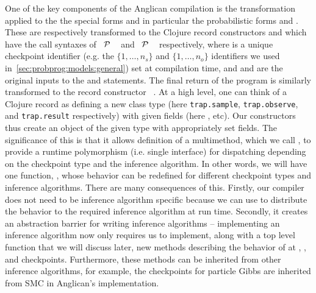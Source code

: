One of the key components of the Anglican compilation is the transformation applied to the
the special forms and in particular the probabilistic forms \sample and \observe.  These
are respectively transformed to the Clojure record constructors \samplecps and \observecps 
which have the call syntaxes of
 ~$\mathcal{P}$ ~\angstate\clj{)} and  ~$\mathcal{P}$ ~\angstate\clj{)}
respectively,
where  is a unique checkpoint identifier (e.g. the $\{1,\dots,n_s\}$ and $\{1,\dots,n_o\}$ identifiers
we used in~\ref{sec:probprog:models:general}) set at compilation time, and   and 
are the original inputs to the \sample and \observe statements.  
The final return of the program is similarly transformed to the record constructor
~\angstate\clj{)}.
At a high level, one can
think of a Clojure record as defining a new class type (here {\small \texttt{trap.sample}}, {\small \texttt{trap.observe}},
and {\small \texttt{trap.result}} respectively) with given fields (here ,  etc).  Our constructors thus create
an object of the given type with appropriately set fields.  The significance of this is that
it allows definition of a multimethod, which we call \checkpoint, to provide a runtime polymorphism
(i.e. single interface) for dispatching depending on the checkpoint
type and the inference algorithm.  In other words, we will have one function, \checkpoint, whose
behavior can be redefined for different checkpoint types and inference algorithms.  There are many
consequences of this.  Firstly, our compiler does not need to be inference algorithm specific
because we can use \checkpoint to distribute the behavior to the required inference algorithm
at run time.  Secondly, it creates an abstraction barrier for writing inference algorithms -- implementing
an inference algorithm now only requires us to implement, along with a top level function \anginfer that
we will discuss later, new methods describing the behavior of \checkpoint at \sample, \observe, and 
checkpoints.  Furthermore, these methods can be inherited from other inference algorithms, for example,
the \observe checkpoints for particle Gibbs are inherited from SMC in Anglican's implementation.

